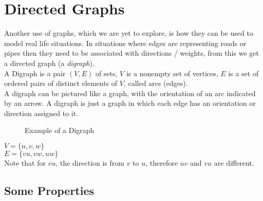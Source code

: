 
\section{Directed Graphs}
Another use of graphs, which we are yet to explore, is how they can be used to model real life situations. In situations where edges are representing roads or pipes then they need to be associated with directions / weights, from this we get a directed graph (a \textit{digraph}). \\

A Digraph is a pair $(V, E)$ of sets, $V$ is a nonempty set of vertices, $E$ is a set of ordered pairs of distinct elements of $V$, called arcs (edges).\\

A digraph can be pictured like a graph, with the orientation of an arc indicated by an arrow. A digraph is just a graph in which each edge has an orientation or direction assigned to it.

\begin{minipage}{0.5\textwidth}
    \begin{figure}[H]
        \centering
        \caption{Example of a Digraph}
    \end{figure}
\end{minipage} \hfill
\begin{minipage}{0.45\textwidth}
$V = \{u, v, w\}$\\
$E = \{vu, vw, uw\}$\\
Note that for $vu$, the direction is from $v$ to $u$, therefore $uv$ and $vu$ are different.
\end{minipage}

\subsection{Some Properties}


